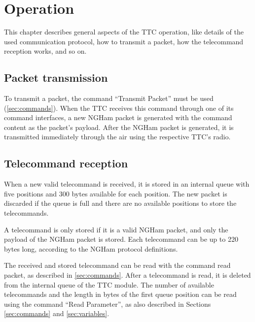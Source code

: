 %
%
%
%
%

%
%
%
%
%


\chapter{Operation} \label{ch:operation}

This chapter describes general aspects of the TTC operation, like details of the used communication protocol, how to transmit a packet, how the telecommand reception works, and so on.

\section{Packet transmission}

    To transmit a packet, the command ``Transmit Packet'' must be used (\autoref{sec:commands}). When the TTC receives this command through one of its command interfaces, a new NGHam packet is generated with the command content as the packet's payload. After the NGHam packet is generated, it is transmitted immediately through the air using the respective TTC's radio.

\section{Telecommand reception}

When a new valid telecommand is received, it is stored in an internal queue with five positions and 300 bytes available for each position. The new packet is discarded if the queue is full and there are no available positions to store the telecommands.

A telecommand is only stored if it is a valid NGHam packet, and only the payload of the NGHam packet is stored. Each telecommand can be up to 220 bytes long, according to the NGHam protocol definitions.

The received and stored telecommand can be read with the command read packet, as described in \autoref{sec:commands}. After a telecommand is read, it is deleted from the internal queue of the TTC module. The number of available telecommands and the length in bytes of the first queue position can be read using the command ``Read Parameter'', as also described in Sections \ref{sec:commands} and \ref{sec:variables}.

